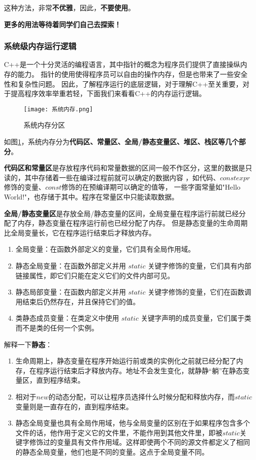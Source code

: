 这种方法，非常\textbf{不优雅}，因此，\textbf{不要使用}。

\textbf{更多的用法等待着同学们自己去探索！}

\subsubsection{系统级内存运行逻辑}

C++是一个十分灵活的编程语言，其中指针的概念为程序员们提供了直接操纵内存的能力。
指针的使用使得程序员可以自由的操作内存，但是也带来了一些安全性和复杂性问题。
因此，了解程序运行的底层逻辑，对于理解C++至关重要，对于提高程序效率举重若轻，下面我们来看看C++的内存运行逻辑。

\begin{figure}[H]
    \centering
    \texttt{[image: 系统内存.png]}
    \caption{系统内存分区} %
    \label{fig:内存分区} %
\end{figure}

如图\ref{fig:内存分区}，系统内存分为\textbf{代码区、常量区、全局/静态变量区、堆区、栈区等几个部分}。

\textbf{代码区和常量区}是存放程序代码和常量数据的区间一般不作区分，这里的数据是只读的，其中存储着一些在编译过程前就可以确定的数据内容
，如代码、$constexpr$修饰的变量、$const$修饰的在预编译期可以确定的值等，
一些字面常量如"Hello World!"，也存储于其中。程序在常量区中只能读取数据。

\textbf{全局/静态变量区}是存放全局/静态变量的区间，全局变量在程序运行前就已经分配了内存，静态变量在程序运行前也已经分配了内存。
但是静态变量的生命周期比全局变量长，它在程序运行结束后才释放内存。

\begin{enumerate}
    \item 全局变量：在函数外部定义的变量，它们具有全局作用域。
    \item 静态全局变量：在函数外部定义并用 $static$ 关键字修饰的变量，它们具有内部链接属性，即它们只能在定义它们的文件内部可见。
    \item 静态局部变量：在函数内部定义并用 $static$ 关键字修饰的变量，它们在函数调用结束后仍然存在，并且保持它们的值。
    \item 类静态成员变量：在类定义中使用 $static$ 关键字声明的成员变量，它们属于类而不是类的任何一个实例。
\end{enumerate}

解释一下\textbf{静态}：
\begin{enumerate}
    \item 生命周期上，静态变量在程序开始运行前或类的实例化之前就已经分配了内存，在程序运行结束后才释放内存。地址不会发生变化，就静静“躺”在静态变量区，直到程序结束。
    \item 相对于$new$的动态分配，可以让程序员选择什么时候分配和释放内存，而$static$变量则是一直存在的，直到程序结束。
    \item 静态全局变量也具有全局作用域，他与全局变量的区别在于如果程序包含多个文件的话，他作用于定义它的文件里，不能作用到其他文件里，即被$static$关键字修饰过的变量具有文件作用域。这样即使两个不同的源文件都定义了相同的静态全局变量，他们也是不同的变量。这点于全局变量不同。
\end{enumerate}

